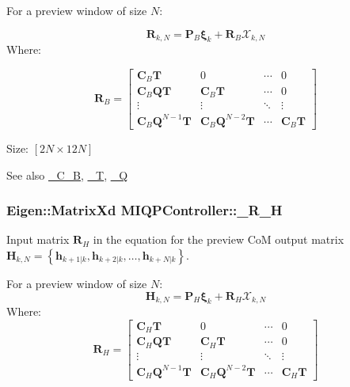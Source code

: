 \-For a preview window of size $N$\-:

\[ \mathbf{R}_{k,N} = \mathbf{P}_B \mathbf{\xi}_k + \mathbf{R}_B \mathcal{X}_{k,N} \] \-Where\-:

\[ \mathbf{R}_B = \left[\begin{array}{cccc} \mathbf{C}_B\mathbf{T} & 0 & \cdots & 0 \\ \mathbf{C}_B\mathbf{Q}\mathbf{T} & \mathbf{C}_B\mathbf{T} & \cdots & 0 \\ \vdots & \vdots & \ddots & \vdots \\ \mathbf{C}_B\mathbf{Q}^{N-1}\mathbf{T} & \mathbf{C}_B\mathbf{Q}^{N-2}\mathbf{T} & \cdots & \mathbf{C}_B\mathbf{T} \end{array}\right] \]

\-Size\-: $[2N\times12N]$

\begin{DoxySeeAlso}{\-See also}
\hyperlink{classMIQPController_a5c6882cb248e9d16513868fea7835d6e}{\-\_\-\-C\-\_\-\-B}, \hyperlink{classMIQPController_a1143455ae85d0e221578dbe5d659af1d}{\-\_\-\-T}, \hyperlink{classMIQPController_ac6404f74d6002d6a0ca4bd2d0b41d548}{\-\_\-\-Q} 
\end{DoxySeeAlso}
\hypertarget{classMIQPController_a2207c17eb221166b1bc12fbca976035d}{
\subsubsection[{\-\_\-\-R\-\_\-\-H}]{\setlength{\rightskip}{0pt plus 5cm}\-Eigen\-::\-Matrix\-Xd {\bf \-M\-I\-Q\-P\-Controller\-::\-\_\-\-R\-\_\-\-H}}}\label{classMIQPController_a2207c17eb221166b1bc12fbca976035d}
\-Input matrix $\mathbf{R}_H$ in the equation for the preview \-Co\-M output matrix $\mathbf{H}_{k,N} = \left\{ \mathbf{h}_{k+1|k}, \mathbf{h}_{k+2|k}, \dots, \mathbf{h}_{k+N|k} \right\}$.

\-For a preview window of size $N$\-: \[ \mathbf{H}_{k,N} = \mathbf{P}_H \mathbf{\xi}_k + \mathbf{R}_H \mathcal{X}_{k,N} \] \-Where\-: \[ \mathbf{R}_H = \left[\begin{array}{cccc} \mathbf{C}_H\mathbf{T} & 0 & \cdots & 0 \\ \mathbf{C}_H\mathbf{Q}\mathbf{T} & \mathbf{C}_H\mathbf{T} & \cdots & 0 \\ \vdots & \vdots & \ddots & \vdots \\ \mathbf{C}_H\mathbf{Q}^{N-1}\mathbf{T} & \mathbf{C}_H\mathbf{Q}^{N-2}\mathbf{T} & \cdots & \mathbf{C}_H\mathbf{T} \end{array}\right] \]

